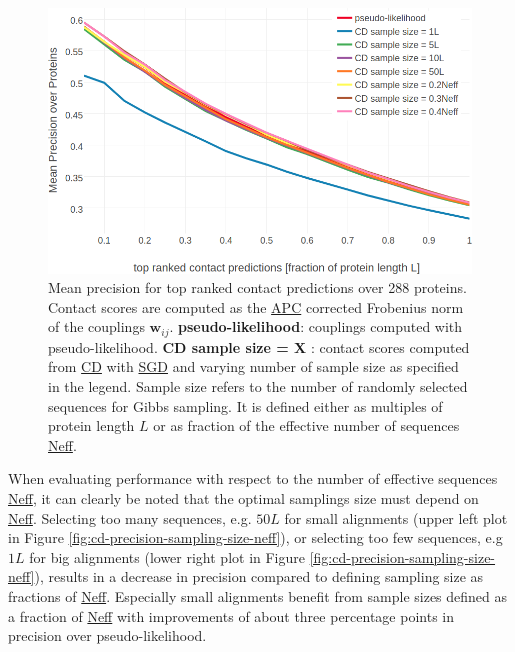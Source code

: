 \documentclass[11pt,a4paper,twoside]{book}
\newcommand{\wij}{\mathbf{w}_{ij}}
\theoremstyle{definition}
\theoremstyle{definition}
\theoremstyle{remark}
\begin{document}
\begin{figure}

{\centering \includegraphics[width=1\linewidth]{img/full_likelihood/gibbs_sampling/precision_vs_rank_samplesize} 

}

\caption{Mean precision for top ranked
contact predictions over 288 proteins. Contact scores are computed as
the \protect\hyperlink{abbrev}{APC} corrected Frobenius norm of the
couplings \(\wij\). \textbf{pseudo-likelihood}: couplings computed with
pseudo-likelihood. \textbf{CD sample size = X }: contact scores computed
from \protect\hyperlink{abbrev}{CD} with \protect\hyperlink{abbrev}{SGD}
and varying number of sample size as specified in the legend. Sample
size refers to the number of randomly selected sequences for Gibbs
sampling. It is defined either as multiples of protein length \(L\) or
as fraction of the effective number of sequences
\protect\hyperlink{abbrev}{Neff}.}\label{fig:cd-performance-samplesize}
\end{figure}

When evaluating performance with respect to the number of effective
sequences \protect\hyperlink{abbrev}{Neff}, it can clearly be noted that
the optimal samplings size must depend on
\protect\hyperlink{abbrev}{Neff}. Selecting too many sequences, e.g.
\(50L\) for small alignments (upper left plot in Figure
\ref{fig:cd-precision-sampling-size-neff}), or selecting too few
sequences, e.g \(1L\) for big alignments (lower right plot in Figure
\ref{fig:cd-precision-sampling-size-neff}), results in a decrease in
precision compared to defining sampling size as fractions of
\protect\hyperlink{abbrev}{Neff}. Especially small alignments benefit
from sample sizes defined as a fraction of
\protect\hyperlink{abbrev}{Neff} with improvements of about three
percentage points in precision over pseudo-likelihood.
\end{document}
